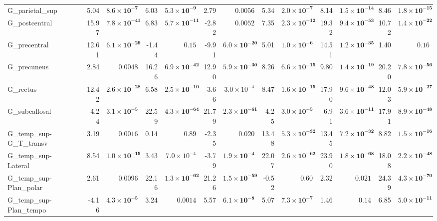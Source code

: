 {\begin{longtable}{llrrrrrrrrrrrr}
G\_parietal\_sup &  & 5.04 & $\mathbf{8.6{\times}10^{-7}}$ & 6.03 & $\mathbf{5.3{\times}10^{-9}}$ & 2.79 & $0.0056$ & 5.34 & $\mathbf{2.0{\times}10^{-7}}$ & 8.14 & $\mathbf{1.5{\times}10^{-14}}$ & 8.46 & $\mathbf{1.8{\times}10^{-15}}$ \\
G\_postcentral &  & 15.97 & $\mathbf{7.8{\times}10^{-41}}$ & 6.83 & $\mathbf{5.7{\times}10^{-11}}$ & -2.82 & $0.0052$ & 7.35 & $\mathbf{2.3{\times}10^{-12}}$ & 19.32 & $\mathbf{9.4{\times}10^{-53}}$ & 10.72 & $\mathbf{1.4{\times}10^{-22}}$ \\
G\_precentral &  & 12.61 & $\mathbf{6.1{\times}10^{-29}}$ & -1.44 & $0.15$ & -9.91 & $\mathbf{6.0{\times}10^{-20}}$ & 5.01 & $\mathbf{1.0{\times}10^{-6}}$ & 14.51 & $\mathbf{1.2{\times}10^{-35}}$ & 1.40 & $0.16$ \\
G\_precuneus &  & 2.84 & $0.0048$ & 16.26 & $\mathbf{6.9{\times}10^{-42}}$ & 12.90 & $\mathbf{5.9{\times}10^{-30}}$ & 8.26 & $\mathbf{6.6{\times}10^{-15}}$ & 9.80 & $\mathbf{1.4{\times}10^{-19}}$ & 20.20 & $\mathbf{7.8{\times}10^{-56}}$ \\
G\_rectus &  & 12.42 & $\mathbf{2.6{\times}10^{-28}}$ & 6.58 & $\mathbf{2.5{\times}10^{-10}}$ & -3.66 & $3.0{\times}10^{-4}$ & 8.47 & $\mathbf{1.6{\times}10^{-15}}$ & 17.90 & $\mathbf{9.6{\times}10^{-48}}$ & 12.03 & $\mathbf{5.9{\times}10^{-27}}$ \\
G\_subcallosal &  & -4.24 & $\mathbf{3.1{\times}10^{-5}}$ & 22.59 & $\mathbf{4.3{\times}10^{-64}}$ & 21.79 & $\mathbf{2.3{\times}10^{-61}}$ & -4.25 & $\mathbf{3.0{\times}10^{-5}}$ & -6.91 & $\mathbf{3.6{\times}10^{-11}}$ & 17.91 & $\mathbf{8.9{\times}10^{-48}}$ \\
G\_temp\_sup-G\_T\_transv &  & 3.19 & $0.0016$ & 0.14 & $0.89$ & -2.35 & $0.020$ & 13.48 & $\mathbf{5.3{\times}10^{-32}}$ & 13.45 & $\mathbf{7.2{\times}10^{-32}}$ & 8.82 & $\mathbf{1.5{\times}10^{-16}}$ \\
G\_temp\_sup-Lateral &  & 8.54 & $\mathbf{1.0{\times}10^{-15}}$ & 3.43 & $7.0{\times}10^{-4}$ & -3.79 & $\mathbf{1.9{\times}10^{-4}}$ & 22.07 & $\mathbf{2.6{\times}10^{-62}}$ & 23.90 & $\mathbf{1.8{\times}10^{-68}}$ & 18.08 & $\mathbf{2.2{\times}10^{-48}}$ \\
G\_temp\_sup-Plan\_polar &  & 2.61 & $0.0096$ & 22.16 & $\mathbf{1.3{\times}10^{-62}}$ & 21.26 & $\mathbf{1.5{\times}10^{-59}}$ & -0.52 & $0.60$ & 2.32 & $0.021$ & 24.39 & $\mathbf{4.3{\times}10^{-70}}$ \\
G\_temp\_sup-Plan\_tempo &  & -4.16 & $\mathbf{4.3{\times}10^{-5}}$ & 3.24 & $0.0014$ & 5.57 & $\mathbf{6.1{\times}10^{-8}}$ & 5.07 & $\mathbf{7.3{\times}10^{-7}}$ & 1.46 & $0.14$ & 6.85 & $\mathbf{5.0{\times}10^{-11}}$ \\

\end{longtable}}
